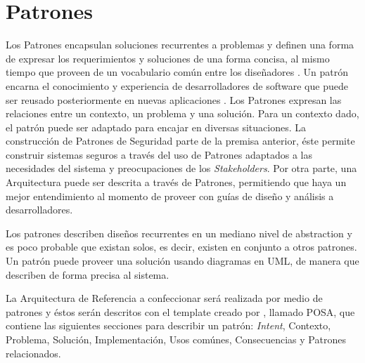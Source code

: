 \section{Patrones}
\label{chap2:Patt}
Los Patrones encapsulan soluciones recurrentes a problemas y definen una forma de expresar los requerimientos y soluciones de una forma concisa, al mismo tiempo que proveen de un vocabulario común entre los diseñadores \cite{buschman1996system}. Un patrón encarna el conocimiento y experiencia de desarrolladores de software que puede ser reusado posteriormente en nuevas aplicaciones \cite{fernandez2004methodology, Fernandez2006, Fernandez2011, fernandez2013security}. Los Patrones expresan las relaciones entre un contexto, un problema y una solución. Para un contexto dado, el patrón puede ser adaptado para encajar en diversas situaciones. La construcción de Patrones de Seguridad parte de la premisa anterior, éste permite construir sistemas seguros a través del uso de Patrones adaptados a las necesidades del sistema y preocupaciones de los \textit{Stakeholders}. Por otra parte, una Arquitectura puede ser descrita a través de Patrones, permitiendo que haya un mejor entendimiento al momento de proveer con guías de diseño y análisis a desarrolladores.

Los patrones describen diseños recurrentes en un mediano nivel de abstraction y es poco probable que existan solos, es decir, existen en conjunto a otros patrones. Un patrón puede proveer una solución usando diagramas en UML, de manera que describen de forma precisa al sistema.

La Arquitectura de Referencia a confeccionar será realizada por medio de patrones y éstos serán descritos con el template creado por \cite{buschman1996system}, llamado POSA, que contiene las siguientes secciones para describir un patrón: \textit{Intent}, Contexto, Problema, Solución, Implementación, Usos comúnes, Consecuencias y Patrones relacionados.





